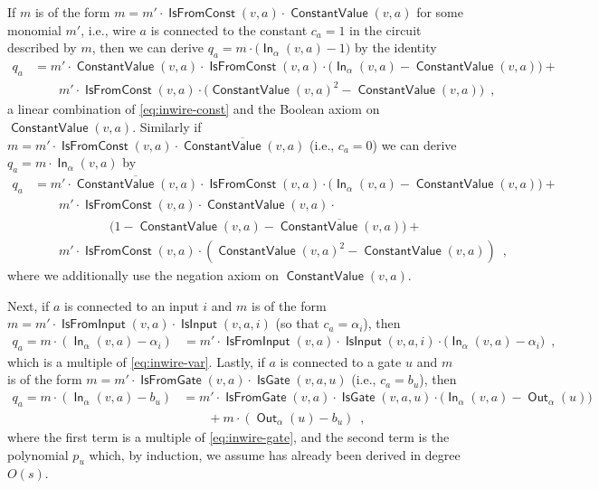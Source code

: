 \documentclass[10pt,a4paper]{article}
\theoremstyle{plain}
\theoremstyle{remark}
\theoremstyle{definition}
\newcommand{\eqcomma}{\enspace ,}
\newcommand{\vars}[1]{\mathsf{#1}}
\DeclareMathOperator{\outwire}{\vars{Out}}
\DeclareMathOperator{\inwire}{\vars{In}}
\DeclareMathOperator{\isfromconst}{\vars{IsFromConst}}
\DeclareMathOperator{\isfromvar}{\vars{IsFromInput}}
\DeclareMathOperator{\isfromgate}{\vars{IsFromGate}}
\DeclareMathOperator{\constval}{\vars{ConstantValue}}
\DeclareMathOperator{\isvar}{\vars{IsInput}}
\DeclareMathOperator{\isgate}{\vars{IsGate}}
\begin{document}
If $m$ is of the form $m = m' \cdot \isfromconst(v,a) \cdot \constval(v, a)$ for some monomial $m'$, i.e., wire $a$
is connected to the constant $c_a = 1$ in the circuit described by $m$, then we
can derive $q_a = m \cdot \big(\inwire_{\alpha}(v,a) - 1\big)$
by the identity
\begin{align}
  \nonumber
  q_a &= m' \cdot \constval(v,a) \cdot \isfromconst(v,a) \cdot \big(\inwire_{\alpha}(v,a) -
        \constval(v, a)\big) +\\
      &\qquad m' \cdot \isfromconst(v,a) \cdot
        \big( \constval(v,a)^2 - \constval(v,a)\big) \eqcomma
\end{align}
a linear combination of \cref{eq:inwire-const} and the Boolean axiom on $\constval(v,a)$.  Similarly if $m = m' \cdot \isfromconst(v,a) \cdot \overline{\constval(v,a)}$ (i.e., $c_a = 0$) we can derive $q_a = m \cdot \inwire_{\alpha}(v,a)$ by
\begin{align}
  \nonumber
  q_a &= m' \cdot \overline{\constval(v,a)} \cdot \isfromconst(v,a) \cdot \big(\inwire_{\alpha}(v,a) -
        \constval(v, a)\big) +\\\nonumber
      &\qquad m' \cdot \isfromconst(v,a) \cdot \constval(v,a) \cdot
         \\\nonumber
      &\qquad\qquad\qquad \big( 1 - \constval(v,a) - \overline{\constval(v,a)}\big) +\\
      &\qquad m' \cdot \isfromconst(v,a) \cdot (\constval(v,a)^2 - \constval(v,a))
        \eqcomma
\end{align}
where we additionally use the negation axiom on $\constval(v,a)$.

Next, if $a$ is connected to an input $i$ and $m$ is of the form
$m = m' \cdot \isfromvar(v, a) \cdot \isvar(v, a, i)$ (so that $c_a = \alpha_i$), then
\begin{align}
  q_a = m \cdot (\inwire_{\alpha}(v,a) - \alpha_i) &= m' \cdot \isfromvar(v, a) \cdot \isvar(v, a, i) \cdot
          \big( \inwire_\alpha(v, a) - \alpha_i\big) \eqcomma
\end{align}
which is a multiple of \cref{eq:inwire-var}.  Lastly, if
$a$ is connected to a gate $u$ and $m$ is of the form
$m = m' \cdot \isfromgate(v, a) \cdot \isgate(v, a, u)$ (i.e., $c_a = b_u$), then
\begin{align}
  \nonumber
  q_a = m \cdot(\inwire_\alpha(v,a) - b_u) &= m' \cdot
          \isfromgate(v, a) \cdot \isgate(v, a, u) \cdot
          \big(\inwire_\alpha(v, a) - \outwire_\alpha(u)\big)\\
                                           &\qquad+ m \cdot (\outwire_\alpha(u) - b_u)
                                             \eqcomma
\end{align}
where the first term is a multiple of \cref{eq:inwire-gate}, and the
second term is the polynomial $p_u$ which, by induction, we assume has
already been derived in degree $O(s)$.
\end{document}
